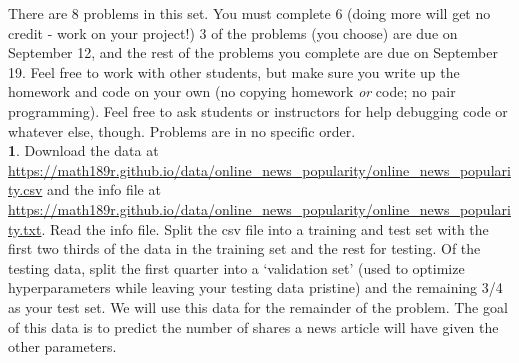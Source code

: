 \documentclass[12pt,letterpaper,fleqn]{hmcpset}
\begin{document}
There are 8 problems in this set. You must complete 6 (doing more will get no
credit - work on your project!) 3 of the problems (you choose) are due on September 12,
and the rest of the problems you complete are due on September 19. Feel
free to work with other students, but make sure you write up the homework
and code on your own (no copying homework \textit{or} code; no pair programming).
Feel free to ask students or instructors for help debugging code or whatever else,
though. Problems are in no specific order.\\[1em]


\textbf{1}. Download the data at 
\url{https://math189r.github.io/data/online_news_popularity/online_news_popularity.csv}
and the info file at
\url{https://math189r.github.io/data/online_news_popularity/online_news_popularity.txt}.
Read the info file. Split the csv file into a training and test set with
the first two thirds of the data in the training set and the rest for testing.
Of the testing data, split the first quarter into a `validation set' (used
to optimize hyperparameters while leaving your testing data pristine) and
the remaining 3/4 as your test set.
We will use this data for the remainder of the problem. The goal of this data
is to predict the number of shares a news article will have given the other
parameters.
\end{document}
